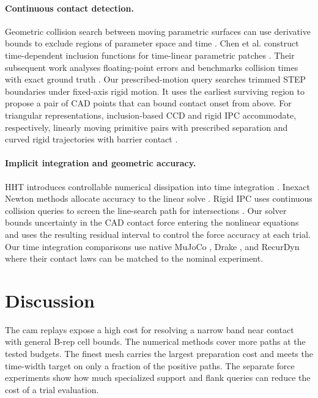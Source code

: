 \documentclass[a4paper,fleqn,longmktitle]{cas-sc}
\begin{document}
\paragraph{Continuous contact detection.}
Geometric collision search between moving parametric surfaces can use derivative bounds to exclude regions of parameter space and time \citep{vonherzen1990}. Chen et al. construct time-dependent inclusion functions for time-linear parametric patches \citep{chen2024}. Their subsequent work analyses floating-point errors and benchmarks collision times with exact ground truth \citep{chen2026}. Our prescribed-motion query searches trimmed STEP boundaries under fixed-axis rigid motion. It uses the earliest surviving region to propose a pair of CAD points that can bound contact onset from above. For triangular representations, inclusion-based CCD and rigid IPC accommodate, respectively, linearly moving primitive pairs with prescribed separation and curved rigid trajectories with barrier contact \citep{wang2021,ferguson2021}.

\paragraph{Implicit integration and geometric accuracy.}
HHT introduces controllable numerical dissipation into time integration \citep{hht1977}. Inexact Newton methods allocate accuracy to the linear solve \citep{dembo1982}. Rigid IPC uses continuous collision queries to screen the line-search path for intersections \citep{ferguson2021}. Our solver bounds uncertainty in the CAD contact force entering the nonlinear equations and uses the resulting residual interval to control the force accuracy at each trial. Our time integration comparisons use native MuJoCo \citep{todorov2012}, Drake \citep{drakecontact}, and RecurDyn \citep{recurdyn} where their contact laws can be matched to the nominal experiment.




\section{Discussion}
The cam replays expose a high cost for resolving a narrow band near contact with general B-rep cell bounds. The numerical methods cover more paths at the tested budgets. The finest mesh carries the largest preparation cost and meets the time-width target on only a fraction of the positive paths. The separate force experiments show how much specialized support and flank queries can reduce the cost of a trial evaluation.
\end{document}
